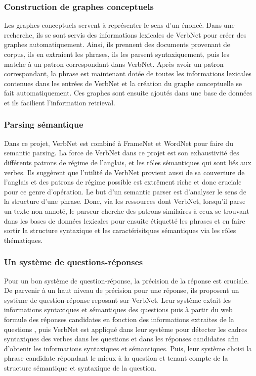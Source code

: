 \subsubsection{Construction de graphes conceptuels}
\citep{HensmanAutomaticallyBuildingConceptual2004}
Les graphes conceptuels servent à représenter le sens d'un énoncé. Dans une recherche, ils se sont servis des informations lexicales de VerbNet pour créer des graphes automatiquement. Ainsi, ils prennent des documents provenant de corpus, ils en extraient les phrases, ils les parsent syntaxiquement, puis les matche à un patron correspondant dans VerbNet. Après avoir un patron correspondant, la phrase est maintenant dotée de toutes les informations lexicales contenues dans les entrées de VerbNet et la création du graphe conceptuelle se fait automatiquement. Ces graphes sont ensuite ajoutés dans une base de données et ils facilient l'information retrieval.

\subsubsection{Parsing sémantique}
\citep{Shi:2005:PPT:2132047.2132058}
Dans ce projet, VerbNet est combiné à FrameNet et WordNet pour faire du semantic parsing. La force de VerbNet dans ce projet est son exhaustivité des différents patrons de régime de l'anglais, et les rôles sémantiques qui sont liés aux verbes. Ils suggèrent que l'utilité de VerbNet provient aussi de sa couverture de l'anglais et des patrons de régime possible est extrêment riche et donc cruciale pour ce genre d'opération. Le but d'un semantic parser est d'analyser le sens de la structure d'une phrase. Donc, via les ressources dont VerbNet, lorsqu'il parse un texte non annoté, le parseur cherche des patrons similaires à ceux se trouvant dans les bases de données lexicales pour ensuite étiquetté les phrases et en faire sortir la structure syntaxique et les caractérisitques sémantiques via les rôles thématiques.

\subsubsection{Un système de questions-réponses}
\citep{DBLP:conf/nlpke/WenJH08}
Pour un bon système de question-réponse, la précision de la réponse est cruciale. De parvenir à un haut niveau de précision pour une réponse, ils proposent un système de question-réponse reposant sur VerbNet. Leur système extait les informations syntaxiques et sémantiques des questions puis à partir du web formule des réponses candidates en fonction des informations extraites de la questions , puis VerbNet est appliqué dans leur système pour détecter les cadres syntaxiques des verbes dans les questions et dans les réponses candidates afin d'obtenir les informations syntaxiques et sémantiques. Puis, leur système choisi la phrase candidate répondant le mieux à la question et tenant compte de la structure sémantique et syntaxique de la question.

